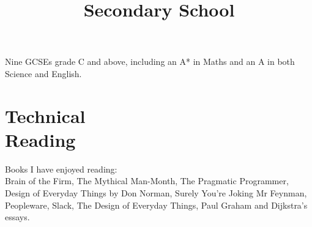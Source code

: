\documentclass[line,margin]{res}
\begin{document}
\begin{resume}
\begin{position}

\end{position}

\title{Secondary School}
\begin{position}
Nine GCSEs grade C and above,
including an A* in Maths and an A in both Science and English.

\end{position}

\section{Technical \\ Reading}
Books I have enjoyed reading: \\
Brain of the Firm,
The Mythical Man-Month, %
The Pragmatic Programmer,
Design of Everyday Things by Don Norman,
Surely You're Joking Mr Feynman,
Peopleware, %
Slack,
The Design of Everyday Things,
Paul Graham and Dijkstra's essays.


\end{resume}
\end{document}
